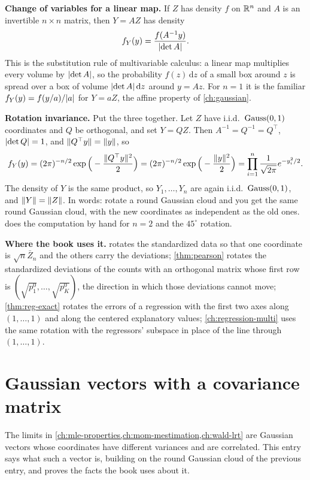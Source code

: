 \textbf{Change of variables for a linear map.}
If $Z$ has density $f$ on $\mathbb{R}^n$ and $A$ is an invertible $n \times n$ matrix, then $Y = AZ$ has density
\[
f_Y(y) = \frac{f(A^{-1}y)}{\lvert\det A\rvert}.
\]
This is the substitution rule of multivariable calculus: a linear map multiplies every volume by $\lvert\det A\rvert$, so the probability $f(z)\,\mathrm{d}z$ of a small box around $z$ is spread over a box of volume $\lvert\det A\rvert\,\mathrm{d}z$ around $y = Az$.
For $n = 1$ it is the familiar $f_Y(y) = f(y/a)/\lvert a\rvert$ for $Y = aZ$, the affine property of \cref{ch:gaussian}.

\textbf{Rotation invariance.}
Put the three together.
Let $Z$ have i.i.d.\ $\text{Gauss}(0,1)$ coordinates and $Q$ be orthogonal, and set $Y = QZ$.
Then $A^{-1} = Q^{-1} = Q^\top$, $\lvert\det Q\rvert = 1$, and $\lVert Q^\top y\rVert = \lVert y\rVert$, so
\[
f_Y(y) = (2\pi)^{-n/2}\exp\Big(-\frac{\lVert Q^\top y\rVert^2}{2}\Big) = (2\pi)^{-n/2}\exp\Big(-\frac{\lVert y\rVert^2}{2}\Big) = \prod_{i=1}^n \frac{1}{\sqrt{2\pi}}e^{-y_i^2/2}.
\]
The density of $Y$ is the same product, so $Y_1, \ldots, Y_n$ are again i.i.d.\ $\text{Gauss}(0,1)$, and $\lVert Y\rVert = \lVert Z\rVert$.
In words: rotate a round Gaussian cloud and you get the same round Gaussian cloud, with the new coordinates as independent as the old ones.
 does the computation by hand for $n = 2$ and the $45^\circ$ rotation.

\textbf{Where the book uses it.}  rotates the standardized data so that one coordinate is $\sqrt{n}\bar{Z}_n$ and the others carry the deviations; \cref{thm:pearson} rotates the standardized deviations of the counts with an orthogonal matrix whose first row is $(\sqrt{p^0_1}, \ldots, \sqrt{p^0_K})$, the direction in which those deviations cannot move; \cref{thm:reg-exact} rotates the errors of a regression with the first two axes along $(1, \ldots, 1)$ and along the centered explanatory values; \cref{ch:regression-multi} uses the same rotation with the regressors' subspace in place of the line through $(1, \ldots, 1)$.

\section{Gaussian vectors with a covariance matrix}
\label{sec:math-gaussquad}

The limits in \cref{ch:mle-properties,ch:mom-mestimation,ch:wald-lrt} are Gaussian vectors whose coordinates have different variances and are correlated.
This entry says what such a vector is, building on the round Gaussian cloud of the previous entry, and proves the facts the book uses about it.

